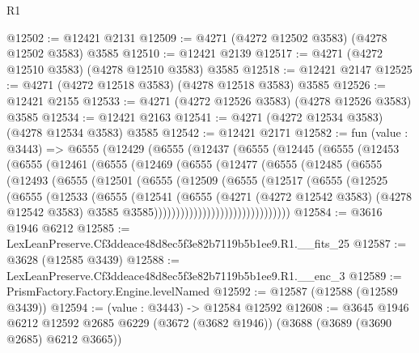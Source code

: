 \begin{lexlean}{R1}
\begin{coremodule}
@12502 := @12421 @2131
@12509 := @4271 (@4272 @12502 @3583) (@4278 @12502 @3583) @3585
@12510 := @12421 @2139
@12517 := @4271 (@4272 @12510 @3583) (@4278 @12510 @3583) @3585
@12518 := @12421 @2147
@12525 := @4271 (@4272 @12518 @3583) (@4278 @12518 @3583) @3585
@12526 := @12421 @2155
@12533 := @4271 (@4272 @12526 @3583) (@4278 @12526 @3583) @3585
@12534 := @12421 @2163
@12541 := @4271 (@4272 @12534 @3583) (@4278 @12534 @3583) @3585
@12542 := @12421 @2171
@12582 := fun (value : @3443) =>
  @6555
    (@12429
      (@6555
        (@12437
          (@6555
            (@12445
              (@6555
                (@12453
                  (@6555
                    (@12461
                      (@6555
                        (@12469
                          (@6555
                            (@12477
                              (@6555
                                (@12485
                                  (@6555
                                    (@12493
                                      (@6555
                                        (@12501
                                          (@6555
                                            (@12509
                                              (@6555
                                                (@12517
                                                  (@6555
                                                    (@12525
                                                      (@6555
                                                        (@12533
                                                          (@6555
                                                            (@12541
                                                              (@6555
                                                                (@4271
                                                                  (@4272 @12542 @3583)
                                                                  (@4278 @12542 @3583)
                                                                  @3585
                                                                  @3585)))))))))))))))))))))))))))))))
@12584 := @3616 @1946 @6212
@12585 := LexLeanPreserve.Cf3ddeace48d8ec5f3e82b7119b5b1ee9.R1.__fits_25
@12587 := @3628 (@12585 @3439)
@12588 := LexLeanPreserve.Cf3ddeace48d8ec5f3e82b7119b5b1ee9.R1.__enc_3
@12589 := PrismFactory.Factory.Engine.levelNamed
@12592 := @12587 (@12588 (@12589 @3439))
@12594 := (value : @3443) -> @12584 @12592
@12608 := @3645
    @1946
    @6212
    @12592
    @2685
    @6229
    (@3672 (@3682 @1946))
    (@3688 (@3689 (@3690 @2685) @6212 @3665))

\end{coremodule}
\end{lexlean}
